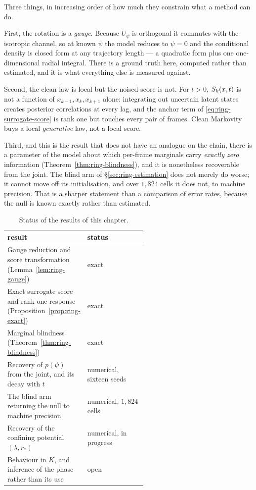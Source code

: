 Three things, in increasing order of how much they constrain what a method can
do.

First, the rotation is a \emph{gauge}. Because $U_\psi$ is orthogonal it
commutes with the isotropic channel, so at known $\psi$ the model reduces to
$\psi = 0$ and the conditional density is closed form at any trajectory length
--- a quadratic form plus one one-dimensional radial integral. There is a
ground truth here, computed rather than estimated, and it is what everything
else is measured against.

Second, the clean law is local but the noised score is not. For $t>0$,
$S_k(x,t)$ is not a function of $x_{k-1},x_k,x_{k+1}$ alone: integrating
out uncertain latent states creates posterior correlations at every lag, and
the anchor term of \eqref{eq:ring-surrogate-score} is rank one but touches
every pair of frames. Clean Markovity buys a local \emph{generative} law, not a
local score.

Third, and this is the result that does not have an analogue on the chain,
there is a parameter of the model about which per-frame marginals carry
\emph{exactly zero} information (Theorem~\ref{thm:ring-blindness}), and it is
nonetheless recoverable from the joint. The blind arm of
\S\ref{sec:ring-estimation} does not merely do worse; it cannot move off its
initialisation, and over $1{,}824$ cells it does not, to machine precision.
That is a sharper statement than a comparison of error rates, because the null
is known exactly rather than estimated.

\begin{table}[t]\centering
\caption{Status of the results of this chapter.}
\label{tab:ring-claims}
\begin{tabular}{@{}p{0.56\linewidth}l@{}}
\toprule
result & status \\
\midrule
Gauge reduction and score transformation
  (Lemma~\ref{lem:ring-gauge}) & exact \\
Exact surrogate score and rank-one response
  (Proposition~\ref{prop:ring-exact}) & exact \\
Marginal blindness (Theorem~\ref{thm:ring-blindness}) & exact \\
Recovery of $p(\psi)$ from the joint, and its decay with $t$
  & numerical, sixteen seeds \\
The blind arm returning the null to machine precision
  & numerical, $1{,}824$ cells \\
Recovery of the confining potential $(\lambda, r_*)$
  & numerical, in progress \\
Behaviour in $K$, and inference of the phase rather than its use
  & open \\
\bottomrule
\end{tabular}
\end{table}


